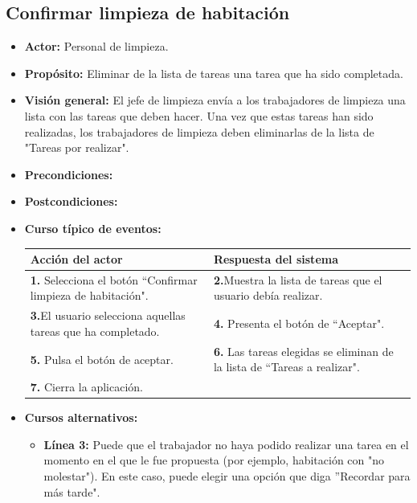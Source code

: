 \documentclass[spanish,a4paper,11pt, twoside]{report}	%
\begin{document}
		\subsection{Confirmar limpieza de habitación}
			\begin{itemize}
			\item \textbf{Actor:} Personal de limpieza.
			\item \textbf{Propósito: }Eliminar de la lista de tareas una tarea que ha sido completada.
			\item \textbf{Visión general: }El jefe de limpieza envía a los trabajadores de limpieza una lista con las tareas que deben hacer. Una vez que estas tareas han sido realizadas, los trabajadores de limpieza deben eliminarlas de la lista de "Tareas por realizar".
			\item \textbf{Precondiciones:} 
			\item \textbf{Postcondiciones:} 
			\item \textbf{Curso típico de eventos:}\\ 
				\begin{tabular}{|p{6cm}||p{6cm}|}
					\hline
					\textbf{Acción del actor} & \textbf{Respuesta del sistema} \\ \hline \hline
					\textbf{1.} Selecciona el botón  “Confirmar limpieza de habitación". & \textbf{2.}Muestra la lista de tareas que el usuario debía realizar.\\ \hline 
					\textbf{3.}El usuario selecciona aquellas tareas que ha completado. & \textbf{4.} Presenta el botón de “Aceptar".\\ \hline
					\textbf{5.} Pulsa el botón de aceptar. & \textbf{6.} Las tareas elegidas se eliminan de la lista de “Tareas a realizar". \\ \hline
					\textbf{7.} Cierra la aplicación.	& \\ \hline	
				\end{tabular}
			\item \textbf{Cursos alternativos:} 
				\begin{itemize}
					\item \textbf{Línea 3:} Puede que el trabajador no haya podido realizar una tarea en el momento en el que le fue propuesta (por ejemplo, habitación con "no molestar").
 En este caso, puede elegir una opción que diga ''Recordar para más tarde".
				\end{itemize}
		\end {itemize}

\end{document}
